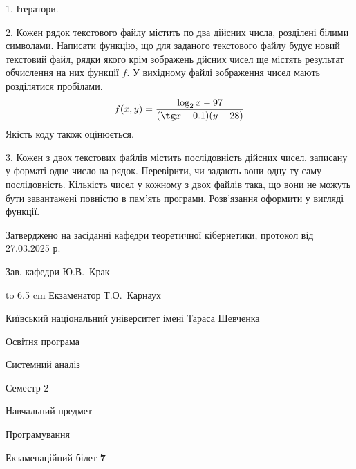 \documentclass[12pt, ukrainian]{article}
\begin{document}
{%
1. Ітератори.%
\par
\vspace{2mm}

2. Кожен рядок текстового файлу містить по два дійсних числа, розділені білими символами.
Написати функцію, що для заданого текстового файлу будує новий текстовий файл, рядки якого крім зображень дйсних чисел ще містять результат обчислення на них функції $f$. У вихідному файлі зображення чисел мають розділятися пробілами. 
$$f(x, y) =\frac{\log_{2} x - 97}{(\tg x + 0.1) (y - 28)}$$ 
Якість коду також оцінюється.

\par
\vspace{2mm}

3. Кожен з двох текстових файлів містить послідовність дійсних чисел, записану у форматі одне число на рядок.  Перевірити, чи задають вони одну ту саму послідовність. Кількість чисел у кожному з двох файлів така, що вони не можуть бути завантажені повністю в пам'ять програми. Розв'язання оформити у вигляді функції.

}
{\smallskip\smallskip \begin {scriptsize} Затверджено на засіданні кафедри теоретичної кібернетики, протокол   від   27.03.2025 р.\par\smallskip\smallskip\smallskip\smallskip
{\parbox {6.5 cm} {Зав. кафедри \dotfill Ю.В.~Крак}}\hspace {0.7cm} {\hbox to 6.5 cm { Екзаменатор \dotfill Т.О.~Карнаух}} \end{scriptsize}}
\newpage
{{\begin {scriptsize}\par
{ \center  Київський національний університет імені Тараса Шевченка \par}
{\parbox {5 cm}{Освітня програма \hfill}{\parbox {7 cm}{Системний аналіз\hfill}}\parbox {6 cm}{\hfill Семестр 2}}\par
{\parbox {5 cm} {Навчальний предмет \hfill}\parbox {7 cm}{Програмування \hfill}\parbox {6cm}{\hfill}\par}\vspace{-15pt} \end{scriptsize}}{\center Екзаменаційний білет \No \textbf { 7 }\par}}
\end{document}
